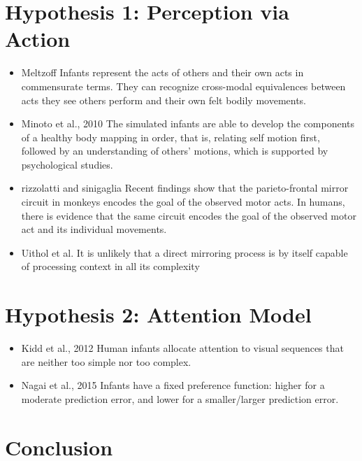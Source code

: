 \documentclass[journal]{IEEEtran}
\begin{document}
\section{Hypothesis 1: Perception via Action} 
\begin{itemize}
\item Meltzoff \cite{meltzoff2007like} Infants represent the acts of others and their own acts in commensurate terms. They can recognize cross-modal equivalences between acts they see others perform and their own felt bodily movements. 
\item Minoto et al., 2010 \cite{Minato2012} The simulated infants are able to develop the components of a healthy body mapping in order, that is, relating self motion first, followed by an understanding of others’ motions, which is supported by psychological studies.
\item rizzolatti and sinigaglia \cite{rizzolatti2010functional} Recent findings show that the parieto-frontal mirror circuit in monkeys encodes the goal of the observed motor acts. In humans, there is evidence that the same circuit encodes the goal of the observed motor act and its individual movements.
\item Uithol et al. \cite{uithol2011mirror} It is unlikely that a direct mirroring process is by itself capable of processing context in all its complexity
\end{itemize}

\section{Hypothesis 2: Attention Model}
\begin{itemize}
\item Kidd et al., 2012 \cite{Kidd2012} Human infants allocate attention to visual sequences that are neither too simple nor too complex.
\item Nagai et al., 2015 \cite{nagai2015model} Infants have a fixed preference function: higher for a moderate prediction error, and lower for a smaller/larger prediction error.
\end{itemize}

\section{Conclusion}



\end{document}
